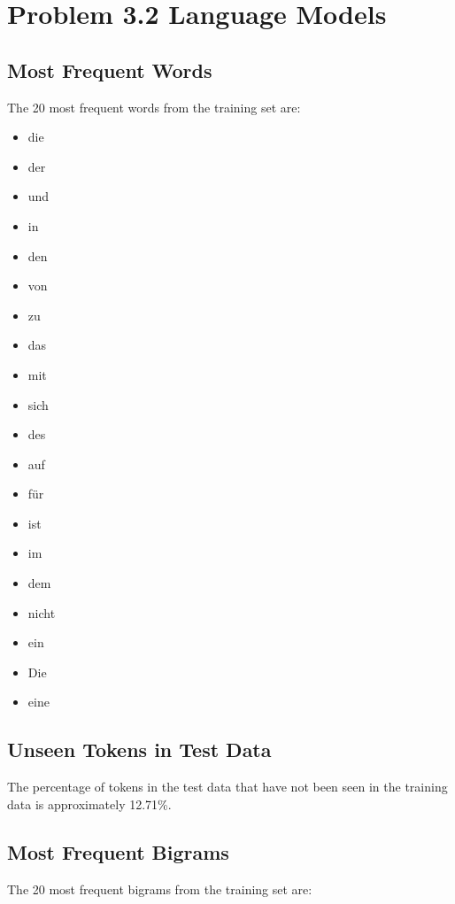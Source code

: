 \documentclass[a4paper,margin=1cm]{article}
\begin{document}
\section{Problem 3.2 Language Models}

\subsection{Most Frequent Words}
The 20 most frequent words from the training set are:

\begin{itemize}
\item die
\item der
\item und
\item in
\item den
\item von
\item zu
\item das
\item mit
\item sich
\item des
\item auf
\item für
\item ist
\item im
\item dem
\item nicht
\item ein
\item Die
\item eine
\end{itemize}

\subsection{Unseen Tokens in Test Data}
The percentage of tokens in the test data that have not been seen in the training data is approximately 12.71\%.

\subsection{Most Frequent Bigrams}
The 20 most frequent bigrams from the training set are:
\end{document}
